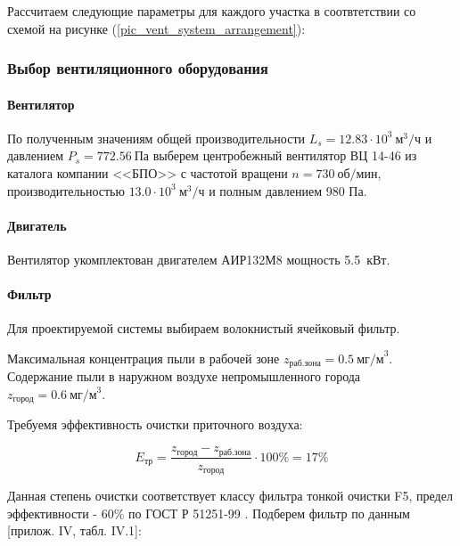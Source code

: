 Рассчитаем следующие параметры для каждого участка в соотвтетствии со схемой на
рисунке (\ref{pic_vent_system_arrangement}):



\subsubsection{Выбор вентиляционного оборудования}

\paragraph{Вентилятор}
По полученным значениям общей производительности $L_s = 12.83 \cdot 10^3 ~\text{м}^3 / \text{ч}$
и давлением $P_s = 772.56 ~\text{Па}$ выберем центробежный
вентилятор ВЦ 14-46 из каталога компании <<БПО>> с частотой вращени
$n = 730 ~\text{об/мин}$, производительностью $13.0 \cdot 10^3 ~\text{м}^3 / \text{ч}$
и полным давлением 980 Па.

\paragraph{Двигатель}
Вентилятор укомплектован двигателем АИР132М8 мощность 5.5~кВт.

\paragraph{Фильтр}
Для проектируемой системы выбираем волокнистый ячейковый фильтр.

Максимальная концентрация пыли в рабочей зоне $z_\text{раб.зона} = 0.5 ~\text{мг/м}^3$.
Содержание пыли в наружном воздухе непромышленного города $z_\text{город} = 0.6 ~\text{мг/м}^3$.

Требуемя эффективность очистки приточного воздуха:

$$
    E_\text{тр} = \frac{z_\text{город} - z_\text{раб.зона}}{z_\text{город}} \cdot 100 \% = 17 \%
$$

Данная степень очистки соответствует классу фильтра тонкой очистки F5, предел
эффективности - 60\% по ГОСТ Р 51251-99 \cite{ecology_gost_51251_99}.
Подберем фильтр по данным \cite{air_ventilation_and_conditioning}[прилож. IV, табл. IV.1]:

